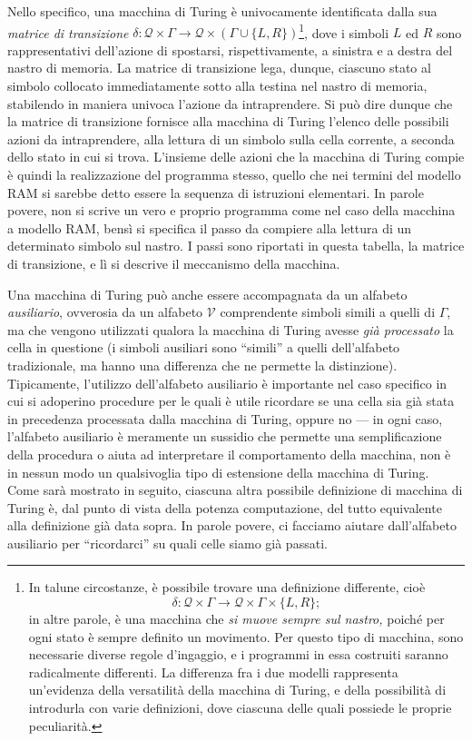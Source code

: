 \documentclass[10pt]{\classname}
\begin{document}
Nello specifico, una macchina di Turing è univocamente identificata dalla sua
\emph{matrice di transizione} $\delta  : \mathcal Q \times \Gamma \rightarrow
\mathcal Q \times (\Gamma \cup \{L,R\})$\footnote{In talune circostanze, è
possibile trovare una definizione differente, cioè $$\delta  : \mathcal Q \times
\Gamma \rightarrow \mathcal Q \times \Gamma \times \{L,R\};$$ in altre parole, è
una macchina che \emph{si muove sempre sul nastro,} poiché per ogni stato è
sempre definito un movimento. Per questo tipo di macchina, sono necessarie
diverse regole d'ingaggio, e i programmi in essa costruiti saranno radicalmente
differenti. La differenza fra i due modelli rappresenta un'evidenza della
versatilità della macchina di Turing, e della possibilità di introdurla con
varie definizioni, dove ciascuna delle quali possiede le proprie peculiarità.},
dove i simboli $L$ ed $R$ sono rappresentativi dell'azione di spostarsi,
rispettivamente, a sinistra e a destra del nastro di memoria. La matrice di
transizione lega, dunque, ciascuno stato al simbolo collocato immediatamente
sotto alla testina nel nastro di memoria, stabilendo in maniera univoca
l'azione da intraprendere. Si può dire dunque che la matrice di transizione
fornisce alla macchina di Turing l'elenco delle possibili azioni da
intraprendere, alla lettura di un simbolo sulla cella corrente, a seconda dello
stato in cui si trova. L'insieme delle azioni che la macchina di Turing compie
è quindi la realizzazione del programma stesso, quello che nei termini del
modello RAM si sarebbe detto essere la sequenza di istruzioni elementari. In
parole povere, non si scrive un vero e proprio programma come nel caso della
macchina a modello RAM, bensì si specifica il passo da compiere alla lettura di
un determinato simbolo sul nastro. I passi sono riportati in questa tabella, la
matrice di transizione, e lì si descrive il meccanismo della macchina.

Una macchina di Turing può anche essere accompagnata da un alfabeto
\emph{ausiliario}, ovverosia da un alfabeto $\mathcal V$ comprendente simboli
simili a quelli di $\Gamma$, ma che vengono utilizzati qualora la macchina di
Turing avesse \emph{già processato} la cella in questione (i simboli ausiliari
sono ``simili'' a quelli dell'alfabeto tradizionale, ma hanno una differenza
che ne permette la distinzione). Tipicamente, l'utilizzo dell'alfabeto
ausiliario è importante nel caso specifico in cui si adoperino procedure per le
quali è utile ricordare se una cella sia già stata in precedenza processata
dalla macchina di Turing, oppure no --- in ogni caso, l'alfabeto ausiliario è
meramente un sussidio che permette una semplificazione della procedura o aiuta
ad interpretare il comportamento della macchina, non è in nessun modo un
qualsivoglia tipo di estensione della macchina di Turing. Come sarà mostrato in
seguito, ciascuna altra possibile definizione di macchina di Turing è, dal
punto di vista della potenza computazione, del tutto equivalente alla
definizione già data sopra. In parole povere, ci facciamo aiutare dall'alfabeto
ausiliario per ``ricordarci'' su quali celle siamo già passati.
\end{document}
